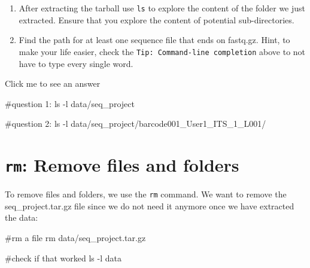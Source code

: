 \documentclass[
  letterpaper,
  DIV=11,
  numbers=noendperiod]{scrreprt}
\newenvironment{Shaded}{}{}
\newcommand{\AttributeTok}[1]{\textcolor[rgb]{0.84,0.23,0.29}{#1}}
\newcommand{\CommentTok}[1]{\textcolor[rgb]{0.42,0.45,0.49}{#1}}
\newcommand{\FunctionTok}[1]{\textcolor[rgb]{0.44,0.26,0.76}{#1}}
\newcommand{\NormalTok}[1]{\textcolor[rgb]{0.14,0.16,0.18}{#1}}
\providecommand{\tightlist}{%
  \setlength{\itemsep}{0pt}\setlength{\parskip}{0pt}}\usepackage{longtable,booktabs,array}
\begin{document}
\begin{tcolorbox}[enhanced jigsaw, bottomtitle=1mm, colframe=quarto-callout-caution-color-frame, left=2mm, leftrule=.75mm, coltitle=black, colbacktitle=quarto-callout-caution-color!10!white, toprule=.15mm, rightrule=.15mm, opacityback=0, titlerule=0mm, colback=white, breakable, bottomrule=.15mm, title=\textcolor{quarto-callout-caution-color}{\faFire}\hspace{0.5em}{Exercise}, arc=.35mm, toptitle=1mm, opacitybacktitle=0.6]

\begin{enumerate}
\def\labelenumi{\arabic{enumi}.}
\tightlist
\item
  After extracting the tarball use \texttt{ls} to explore the content of
  the folder we just extracted. Ensure that you explore the content of
  potential sub-directories.
\item
  Find the path for at least one sequence file that ends on fastq.gz.
  Hint, to make your life easier, check the
  \texttt{Tip:\ Command-line\ completion} above to not have to type
  every single word.
\end{enumerate}

Click me to see an answer

\begin{Shaded}
\begin{Highlighting}[]
\CommentTok{\#question 1:}
\FunctionTok{ls} \AttributeTok{{-}l}\NormalTok{ data/seq\_project}

\CommentTok{\#question 2:}
\FunctionTok{ls} \AttributeTok{{-}l}\NormalTok{ data/seq\_project/barcode001\_User1\_ITS\_1\_L001/}
\end{Highlighting}
\end{Shaded}

\end{tcolorbox}

\section{\texorpdfstring{\texttt{rm}: Remove files and
folders}{rm: Remove files and folders}}\label{rm-remove-files-and-folders}

To remove files and folders, we use the \texttt{rm} command. We want to
remove the seq\_project.tar.gz file since we do not need it anymore once
we have extracted the data:

\begin{Shaded}
\begin{Highlighting}[]
\CommentTok{\#rm a file}
\FunctionTok{rm}\NormalTok{ data/seq\_project.tar.gz}

\CommentTok{\#check if that worked}
\FunctionTok{ls} \AttributeTok{{-}l}\NormalTok{ data}
\end{Highlighting}
\end{Shaded}
\end{document}
